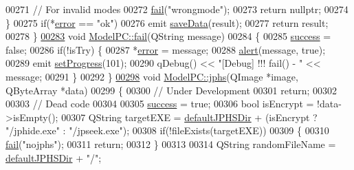 \begin{DoxyCode}
00271         \textcolor{comment}{// For invalid modes}
00272         \hyperlink{class_model_p_c_a47464b59b7e37fcee25e55475708aabd}{fail}(\textcolor{stringliteral}{"wrongmode"});
00273         \textcolor{keywordflow}{return} \textcolor{keyword}{nullptr};
00274     \}
00275     \textcolor{keywordflow}{if}(*\hyperlink{class_model_p_c_a4e5a9c0ca1f06fe5bc478b6bf248c37c}{error} == \textcolor{stringliteral}{"ok"})
00276         emit \hyperlink{class_model_p_c_a0855107fb0ccc247cd9e893fae9bb08a}{saveData}(result);
00277     \textcolor{keywordflow}{return} result;
00278 \}
\hypertarget{modelpc_8cpp_source.tex_l00283}{}\hyperlink{class_model_p_c_a47464b59b7e37fcee25e55475708aabd}{00283} \textcolor{keywordtype}{void} \hyperlink{class_model_p_c_a47464b59b7e37fcee25e55475708aabd}{ModelPC::fail}(QString message)
00284 \{
00285     \hyperlink{class_model_p_c_a945ffbbc44a832b953c191debd448f4c}{success} = \textcolor{keyword}{false};
00286     \textcolor{keywordflow}{if}(!isTry) \{
00287         *\hyperlink{class_model_p_c_a4e5a9c0ca1f06fe5bc478b6bf248c37c}{error} = message;
00288         \hyperlink{class_model_p_c_a9079a101d83672aa48fd2dbac797de40}{alert}(message, \textcolor{keyword}{true});
00289         emit \hyperlink{class_model_p_c_afdcd80f0ed5062e145a71f09b0897547}{setProgress}(101);
00290         qDebug() << \textcolor{stringliteral}{"[Debug] !!! fail() - "} << message;
00291     \}
00292 \}
\hypertarget{modelpc_8cpp_source.tex_l00298}{}\hyperlink{class_model_p_c_a8bee0255c09449868c7e6097afaaf0cd}{00298} \textcolor{keywordtype}{void} \hyperlink{class_model_p_c_a8bee0255c09449868c7e6097afaaf0cd}{ModelPC::jphs}(QImage *image, QByteArray *data)
00299 \{
00300     \textcolor{comment}{// Under Development}
00301     \textcolor{keywordflow}{return};
00302 
00303     \textcolor{comment}{// Dead code}
00304 
00305     \hyperlink{class_model_p_c_a945ffbbc44a832b953c191debd448f4c}{success} = \textcolor{keyword}{true};
00306     \textcolor{keywordtype}{bool} isEncrypt = !data->isEmpty();
00307     QString targetEXE = \hyperlink{class_model_p_c_abd038306f14f22fb885a1697c96d6335}{defaultJPHSDir} + (isEncrypt ? \textcolor{stringliteral}{"/jphide.exe"} : \textcolor{stringliteral}{"/jpseek.exe"});
00308     \textcolor{keywordflow}{if}(!fileExists(targetEXE))
00309     \{
00310         \hyperlink{class_model_p_c_a47464b59b7e37fcee25e55475708aabd}{fail}(\textcolor{stringliteral}{"nojphs"});
00311         \textcolor{keywordflow}{return};
00312     \}
00313 
00314     QString randomFileName = \hyperlink{class_model_p_c_abd038306f14f22fb885a1697c96d6335}{defaultJPHSDir} + \textcolor{stringliteral}{"/"};

\end{DoxyCode}

